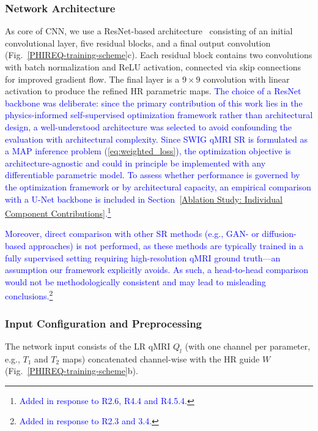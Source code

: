 \documentclass[journal,twoside,web]{ieeecolor}
\newcommand{\added}[1]{\textcolor{blue}{#1}}      %
\begin{document}
\subsubsection{Network Architecture}
As core of CNN, we use a ResNet-based architecture~\cite{b23} consisting of an initial convolutional layer, five residual blocks, and a final output convolution (Fig.~\ref{PHIREQ-training-scheme}c). Each residual block contains two convolutions with batch normalization and ReLU activation, connected via skip connections for improved gradient flow.  The final layer is a $9\times9$ convolution with linear activation to produce the refined HR parametric maps. \added{The choice of a ResNet backbone was deliberate: since the primary contribution of this work lies in the physics-informed self-supervised optimization framework rather than architectural design, a well-understood architecture was selected to avoid confounding the evaluation with architectural complexity. Since SWIG qMRI SR is formulated as a MAP inference problem (\eqref{eq:weighted_loss}), the optimization objective is architecture-agnostic and could in principle be implemented with any differentiable parametric model. To assess whether performance is governed by the optimization framework or by architectural capacity, an empirical comparison with a U-Net backbone is included in Section~\ref{Ablation Study: Individual Component Contributions}.\footnote{\textcolor{blue}{Added in response to R2.6, R4.4 and R4.5.4.}}}

\added{Moreover, direct comparison with other SR methods (e.g., GAN- or diffusion-based approaches) is not performed, as these methods are typically trained in a fully supervised setting requiring high-resolution qMRI ground truth—an assumption our framework explicitly avoids. As such, a head-to-head comparison would not be methodologically consistent and may lead to misleading conclusions.\footnote{\textcolor{blue}{Added in response to R2.3 and 3.4.}} }

\subsubsection{Input Configuration and Preprocessing}
The network input consists of the LR qMRI $Q_l$ (with one channel per parameter, e.g., $T_1$ and $T_2$ maps) concatenated channel-wise with the HR guide $W$ (Fig.~\ref{PHIREQ-training-scheme}b).
\end{document}
